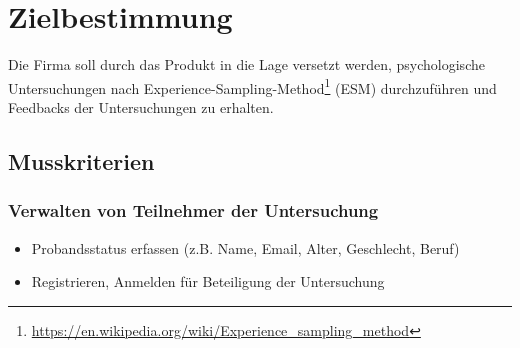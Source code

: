 \documentclass[a4paper]{scrreprt}
\begin{document}
 
 
    \tableofcontents
 
    \chapter{Zielbestimmung}
        Die Firma soll durch das Produkt in die Lage versetzt werden, psychologische Untersuchungen nach Experience-Sampling-Method\footnote{\url{https://en.wikipedia.org/wiki/Experience_sampling_method}} (ESM) durchzuf\"uhren und Feedbacks der Untersuchungen zu erhalten.
 
 
        \section{Musskriterien}

            \subsection{Verwalten von Teilnehmer der Untersuchung}
                \begin{itemize}
                    \item Probandsstatus erfassen (z.B. Name, Email, Alter, Geschlecht, Beruf)
                    \item Registrieren, Anmelden f\"ur Beteiligung der Untersuchung
                \end{itemize}
            
\end{document}
